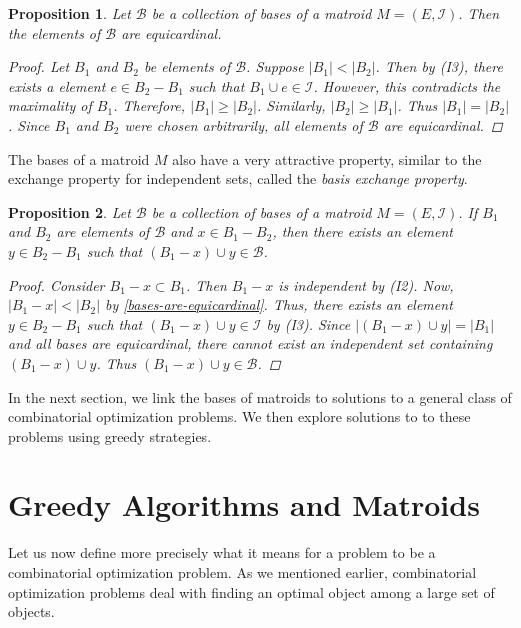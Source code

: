 \documentclass[a4paper,11pt]{report}
\theoremstyle{plain}
\newtheorem{prp}[prp]{Proposition}
\theoremstyle{definition}
\newcommand{\I}{\mathcal{I}}
\newcommand{\B}{\mathscr{B}}
\begin{document}
\begin{prp}\label{bases-are-equicardinal}
Let $\B$ be a collection of bases of a matroid $M = (E,\I)$. Then the elements
of $\B$ are equicardinal.

\begin{proof}
Let $B_1$ and $B_2$ be elements of $\B$. Suppose $|B_1| < |B_2|$. Then by
(I3), there exists a element $e \in B_2 - B_1$ such that $B_1 \cup e \in \I$.
However, this contradicts the maximality of $B_1$. Therefore,
$|B_1| \geq |B_2|$. Similarly, $|B_2| \geq |B_1|$. Thus $|B_1| = |B_2|$. Since
$B_1$ and $B_2$ were chosen arbitrarily, all elements of $\B$ are equicardinal.
\end{proof}
\end{prp}

The bases of a matroid $M$ also have a very attractive property, similar to the
exchange property for independent sets, called the
\emph{basis exchange property}.

\begin{prp}\label{basis-exchange}
Let $\B$ be a collection of bases of a matroid $M = (E,\I)$. If $B_1$ and
$B_2$ are elements of $\B$ and $x \in B_1 - B_2$, then there exists an element
$y \in B_2 - B_1$ such that $(B_1 - x) \cup y \in \B$.

\begin{proof}
Consider $B_1 - x \subset B_1$. Then $B_1 - x$ is independent by (I2). Now,
$|B_1 - x| < |B_2|$ by \autoref{bases-are-equicardinal}. Thus, there exists an
element $y \in B_2 - B_1$ such that $(B_1 - x) \cup y \in \I$ by (I3). Since
$|(B_1 - x) \cup y| = |B_1|$ and all bases are equicardinal, there cannot
exist an independent set containing $(B_1 - x) \cup y$. Thus $(B_1 - x) \cup
y \in \B$.
\end{proof}
\end{prp}


In the next section, we link the bases of matroids to solutions to a general
class of combinatorial optimization problems. We then explore solutions to to
these problems using greedy strategies.

\section{Greedy Algorithms and Matroids}

Let us now define more precisely what it means for a problem to be a
combinatorial optimization problem. As we mentioned earlier, combinatorial
optimization problems deal with finding an optimal object among a large set of
objects.
\end{document}
